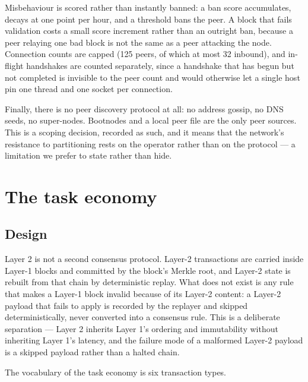 \documentclass{article}
\begin{document}
Misbehaviour is scored rather than instantly banned: a ban score accumulates,
decays at one point per hour, and a threshold bans the peer. A block that fails
validation costs a small score increment rather than an outright ban, because
a peer relaying one bad block is not the same as a peer attacking the node.
Connection counts are capped (125 peers, of which at most 32 inbound), and
in-flight handshakes are counted separately, since a handshake that has begun
but not completed is invisible to the peer count and would otherwise let a
single host pin one thread and one socket per connection.

Finally, there is no peer discovery protocol at all: no address gossip, no
DNS seeds, no super-nodes. Bootnodes and a local peer file are the only peer
sources. This is a scoping decision, recorded as such, and it means that the
network's resistance to partitioning rests on the operator rather than on the
protocol --- a limitation we prefer to state rather than hide.


\section{The task economy}
\label{sec:l2}

\subsection{Design}

Layer 2 is not a second consensus protocol. Layer-2 transactions are carried
inside Layer-1 blocks and committed by the block's Merkle root, and Layer-2
state is rebuilt from that chain by deterministic replay. What does not exist
is any rule that makes a Layer-1 block invalid because of its Layer-2 content:
a Layer-2 payload that fails to apply is recorded by the replayer and skipped
deterministically, never converted into a consensus rule. This is a
deliberate separation --- Layer 2 inherits Layer 1's ordering and immutability
without inheriting Layer 1's latency, and the failure mode of a malformed
Layer-2 payload is a skipped payload rather than a halted chain.

The vocabulary of the task economy is six transaction types.
\end{document}
